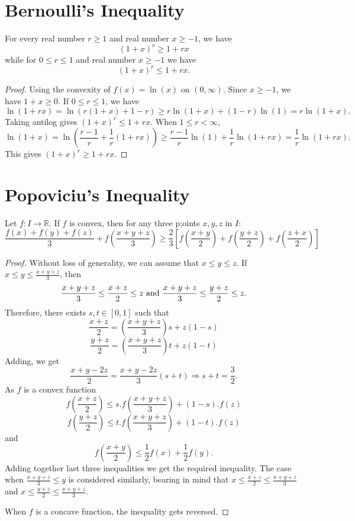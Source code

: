 \section{Bernoulli's Inequality}
\begin{theorem}
  For every real number $r\geq 1$ and real number $x\geq -1$, we have $$(1 + x)^r\geq 1 + rx$$ while for $0\leq r\leq 1$ and real
  number $x\geq -1$ we have $$(1 + x)^r\leq 1 + rx.$$
\end{theorem}

\begin{proof}
  Using the convexity of $f(x) = \ln(x)$ on $(0, \infty)$. Since $x\geq -1$, we have $1 + x\geq 0$. If $0 \leq r \leq 1$, we have
  $$\ln(1 + rx) = \ln(r(1 + x) + 1 - r)\geq r\ln(1 + x) + (1 - r)\ln(1) = r\ln(1 + x).$$
  Taking antilog gives $(1 + x)^r\leq 1 + rx.$ When $1\leq r < \infty$,
  $$\ln(1 + x) = \ln\left(\frac{r - 1}{r} + \frac{1}{r}(1 + rx)\right)\geq\frac{r - 1}{r}\ln(1) + \frac{1}{r}\ln(1 + rx) =
  \frac{1}{r}\ln(1 + rx).$$
  This gives $(1 + x)^r\geq 1 + rx.$
\end{proof}

\section{Popoviciu's Inequality}
\begin{theorem}
  Let $f: I\rightarrow\mathbb{R}$. If $f$ is convex, then for any three p;oints $x, y, z$ in $I$:
  \begin{equation}
    \frac{f(x) + f(y) + f(z)}{3} + f\left(\frac{x + y + z}{3}\right)\geq \frac{2}{3}\left[f\left(\frac{x + y}{2}\right) +
      f\left(\frac{y + z}{2}\right) + f\left(\frac{z + x}{2}\right)\right]
  \end{equation}
\end{theorem}

\begin{proof}
  Without loss of generality, we can assume that $x\leq y\leq z$. If $x\leq y\leq \frac{x + y + z}{3}$, then
  $$\frac{x + y + z}{3}\leq \frac{x + z}{2}\leq z\text{~{\rm{and}}~}\frac{x + y + z}{3}\leq \frac{y + z}{2}\leq z.$$
  Therefore, there exists $s, t\in[0,1]$ such that
  $$\frac{x + z}{2} = \left(\frac{x + y + z}{3}\right)s + z(1 - s)$$
  $$\frac{y + z}{2} = \left(\frac{x + y + z}{3}\right)t + z(1 - t)$$
  Adding, we get
  $$\frac{x + y - 2z}{2} = \frac{x + y - 2z}{3}(s + t)\Rightarrow s + t = \frac{3}{2}.$$
  As $f$ is a convex function
  $$f\left(\frac{x + z}{2}\right)\leq s.f\left(\frac{x + y + z}{3}\right) + (1 - s).f(z)$$
  $$f\left(\frac{y + z}{2}\right)\leq t.f\left(\frac{x + y + z}{3}\right) + (1 - t).f(z)$$
  and
  $$f\left(\frac{x + y}{2}\right)\leq \frac{1}{2}f(x) + \frac{1}{2}f(y).$$
  Adding together last three inequalities we get the required inequality.
  The case when $\frac{x + y + z}{3}\leq y$ is considered similarly, bearing in mind that $x\leq \frac{x + z}{2}\leq \frac{x + y +
    z}{3}$ and $x\leq\frac{y + z}{2}\leq\frac{x + y + z}{3}$.

  When $f$ is a concave function, the inequality gets reversed.
\end{proof}

